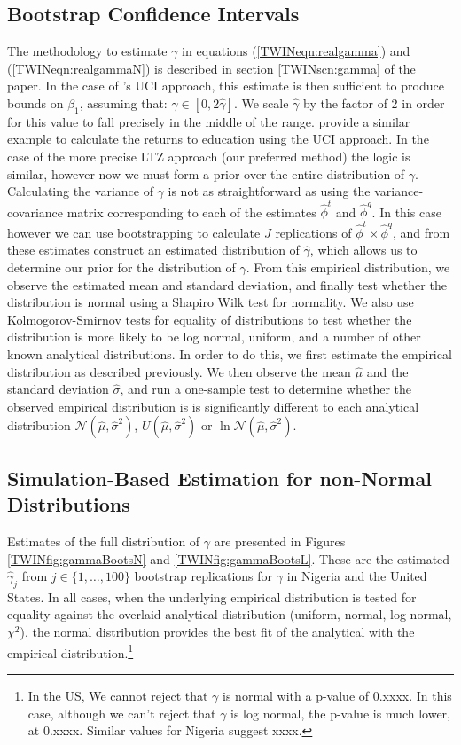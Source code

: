 \documentclass[a4paper, 11pt]{article}
\theoremstyle{plain}
\begin{document}
\subsection{Bootstrap Confidence Intervals}
The methodology to estimate $\gamma$ in equations (\ref{TWINeqn:realgamma}) and
(\ref{TWINeqn:realgammaN}) is described in section \ref{TWINscn:gamma} of the
paper.  In the case of \citeauthor{Conleyetal2012}'s UCI approach, this estimate
is then sufficient to produce bounds on $\beta_1$, assuming that:
$\gamma\in[0,2\hat\gamma]$. We scale $\hat\gamma$ by the factor of 2 in order for
this value to fall precisely in the middle of the range. \citet{Conleyetal2012}
provide a similar example to calculate the returns to education using the UCI
approach.  In the case of the more precise LTZ approach (our preferred method)
the logic is similar, however now we must form a prior over the entire
distribution of $\gamma$.  Calculating the variance of $\gamma$ is not as
straightforward as using the variance-covariance matrix corresponding to each of
the estimates $\hat\phi^t$ and $\hat\phi^q$.  In this case however we can use
bootstrapping to calculate $J$ replications of $\hat\phi^t\times\hat\phi^q$, and
from these estimates construct an estimated distribution of $\hat\gamma$, which
allows us to determine our prior for the distribution of $\gamma$.  From this
empirical distribution, we observe the estimated mean and standard deviation, and
finally test whether the distribution is normal using a Shapiro Wilk test for
normality. We also use Kolmogorov-Smirnov tests for equality of distributions to
test whether the distribution is more likely to be log normal, uniform, and a
number of other known analytical distributions. In order to do this, we first
estimate the empirical distribution as described previously.  We then observe the
mean $\hat\mu$ and the standard deviation $\hat\sigma$, and run a one-sample test
to determine whether the observed empirical distribution is is significantly
different to each analytical distribution $\mathcal{N}(\hat\mu,\hat\sigma^2)$,
$U(\hat\mu,\hat\sigma^2)$ or $\ln\mathcal{N}(\hat\mu,\hat\sigma^2)$.

\subsection{Simulation-Based Estimation for non-Normal Distributions}
Estimates of the full distribution of $\gamma$ are presented in Figures
\ref{TWINfig:gammaBootsN} and \ref{TWINfig:gammaBootsL}.  These are
the estimated $\hat\gamma_j$ from $j \in \{1,\ldots,100\}$ bootstrap
replications for $\gamma$ in Nigeria and the United States.  In all cases,
when the underlying empirical distribution is tested for equality against
the overlaid analytical distribution (uniform, normal, log normal, $\chi^2$),
the normal distribution provides the best fit of the analytical with the
empirical distribution.\footnote{In the US, We cannot reject that $\gamma$
  is normal with a p-value of 0.xxxx.  In this case, although we can't reject
  that $\gamma$ is log normal, the p-value is much lower, at 0.xxxx.  Similar
  values for Nigeria suggest xxxx.
}
\end{document}
